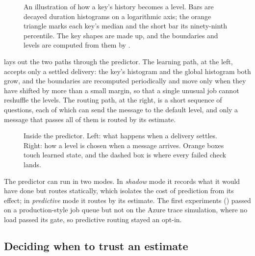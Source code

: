 \begin{figure}[t]
  \centering
  
  \caption{An illustration of how a key's history becomes a level. Bars are decayed duration histograms on a logarithmic axis; the orange
  triangle marks each key's median and the short bar its ninety-ninth percentile. The key shapes are made up, and the boundaries and levels are
  computed from them by .}
  \label{fig:histogram}
\end{figure}

 lays out the two paths through the predictor. The learning path, at the left, accepts only a settled delivery: the key's histogram and the global histogram both
grow, and the boundaries are recomputed periodically and move only when they have shifted by more than a small margin, so that a single unusual job cannot reshuffle the levels. The
routing path, at the right, is a short sequence of questions, each of which can send the message to the default level, and only a message that passes all of them is routed by its estimate.

\begin{figure}[t]
  \centering
  
  \caption{Inside the predictor. Left: what happens when a delivery settles. Right: how a level is chosen when a message arrives. Orange boxes
  touch learned state, and the dashed box is where every failed check lands.}
  \label{fig:predictor}
\end{figure}

The predictor can run in two modes. In \emph{shadow} mode it records what it would have done but routes statically, which isolates the cost of prediction from its effect; in
\emph{predictive} mode it routes by its estimate. The first experiments () passed on a production-style job queue but not on the Azure trace simulation, where no
load passed its gate, so predictive routing stayed an opt-in.

\subsection{Deciding when to trust an estimate}\label{sec:trust}

